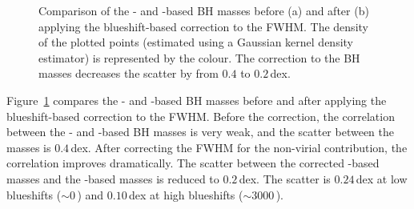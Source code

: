 \begin{figure}
    \captionsetup[subfigure]{labelformat=empty}  
    \centering 
    \subfloat[\label{fig:bhm_comparison_a}]{}
    \subfloat[\label{fig:bhm_comparison_b}]{}
    \caption[{Comparison of the - and \hans-based BH masses before and after applying the  blueshift-based correction to the  FWHM.}]{Comparison of the - and \hans-based BH masses before (a) and after (b) applying the  blueshift-based correction to the  FWHM. The density of the plotted points (estimated using a Gaussian kernel density estimator) is represented by the colour. The correction to the  BH masses decreases the scatter by from $0.4$ to $0.2$\,dex.}   
    \label{fig:bhm_comparison}
\end{figure}

Figure~\ref{fig:bhm_comparison} compares the - and \hans-based BH masses before and after applying the blueshift-based correction to the  FWHM.
Before the correction, the correlation between the - and \hans-based BH masses is very weak, and the scatter between the masses is $0.4$\,dex. 
After correcting the  FWHM for the non-virial contribution, the correlation improves dramatically. 
The scatter between the corrected -based masses and the \hans-based masses is reduced to $0.2$\,dex. 
The scatter is $0.24$\,dex at low  blueshifts ($\sim0$\,\kms) and $0.10$\,dex at high blueshifts ($\sim3000$\,\kms). 

